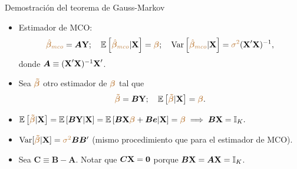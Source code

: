\documentclass[10pt, xcolor=dvipsnames]{beamer}
\begin{document}
\begin{frame}{Demostración del teorema de Gauss-Markov}\label{ANEX:Gauss-Markov}
\begin{itemize}
    \item Estimador de MCO: 
    \begin{align*}
    \begin{split}
        \textcolor{brown}{\hat{\boldsymbol{\beta}}_{mco}} = \boldsymbol{A} \textbf{Y}; \quad \operatorname{\mathbb{E}}\left[\textcolor{brown}{\hat{\boldsymbol{\beta}}_{mco}}|\textbf{X}\right]=\textcolor{brown}{\boldsymbol{\beta}}; \quad \operatorname{Var}\left[\textcolor{brown}{\hat{\boldsymbol{\beta}}_{mco}}|\textbf{X}\right]=\textcolor{brown}{\sigma^2} (\textbf{X}'\textbf{X})^{-1},
    \end{split}
    \end{align*}		
    donde $\boldsymbol{A} \equiv (\textbf{X}'\textbf{X})^{-1}\textbf{X}'$. \vspace{0.3cm}
    \item Sea $\textcolor{brown}{\boldsymbol{\tilde{\beta}}}$ otro estimador de $\textcolor{brown}{\boldsymbol{\beta}}$ tal que
    \begin{align*}
    \begin{split}
        \textcolor{brown}{\boldsymbol{\tilde{\beta}}} = \boldsymbol{B} \textbf{Y}; \quad \operatorname{\mathbb{E}}\left[\textcolor{brown}{\boldsymbol{\tilde{\beta}}}|\textbf{X}\right]=\textcolor{brown}{\boldsymbol{\beta}}.
    \end{split}
    \end{align*}
    \item[i.] $\operatorname{\mathbb{E}}\left[\textcolor{brown}{\boldsymbol{\tilde{\beta}}}|\textbf{X}\right] = \operatorname{\mathbb{E}}\left[\boldsymbol{B} \textbf{Y}|\textbf{X}\right]=\operatorname{\mathbb{E}}\left[\boldsymbol{B}\textbf{X} \textcolor{brown}{\boldsymbol{\beta}}+ \boldsymbol{B}\boldsymbol{e}|\textbf{X}\right]= \textcolor{brown}{\boldsymbol{\beta}} \implies \boldsymbol{B}\textbf{X} = \boldsymbol{\mathbb{I}}_{K}.$
    \item[ii.] $\operatorname{Var}[\textcolor{brown}{\boldsymbol{\tilde{\beta}}}|\textbf{X}] = \textcolor{brown}{\sigma^2} \boldsymbol{B}\boldsymbol{B}'$ (mismo procedimiento que para el estimador de MCO). \vspace{0.3cm}
    \item Sea $\boldsymbol{C} \equiv \boldsymbol{B}-\boldsymbol{A}$. Notar que $\boldsymbol{C}\textbf{X}=\boldsymbol{0}$ porque $\boldsymbol{B}\textbf{X}=\boldsymbol{A}\textbf{X}=\boldsymbol{\mathbb{I}}_{K}$.
\end{itemize}
\end{frame}
\end{document}
